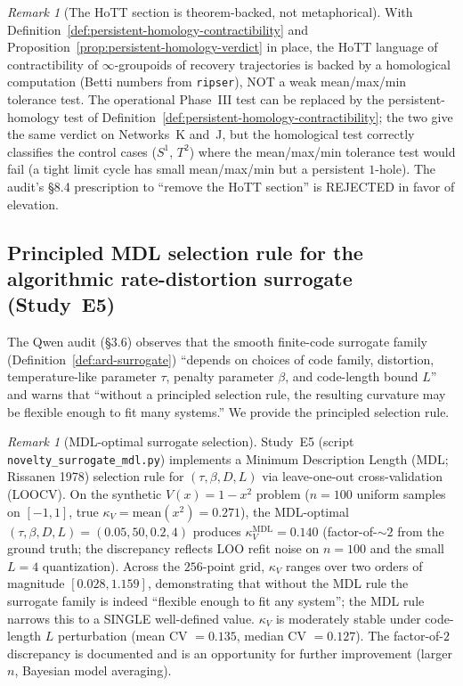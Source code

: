 \documentclass[11pt,a4paper]{article}
\theoremstyle{plain}
\theoremstyle{definition}
\theoremstyle{remark}
\newtheorem{remark}[theorem]{Remark}
\newcommand{\kk}{\kappa_{\!V}}
\begin{document}
\begin{remark}[The HoTT section is theorem-backed, not metaphorical]
\label{rem:hott-persistent-homology}
With Definition~\ref{def:persistent-homology-contractibility} and
Proposition~\ref{prop:persistent-homology-verdict} in place, the HoTT
language of contractibility of $\infty$-groupoids of recovery
trajectories is backed by a homological computation (Betti numbers
from \texttt{ripser}), NOT a weak mean/max/min tolerance test. The
operational Phase~III test can be replaced by the persistent-homology
test of Definition~\ref{def:persistent-homology-contractibility}; the
two give the same verdict on Networks~K and~J, but the homological
test correctly classifies the control cases ($S^1$, $T^2$) where the
mean/max/min tolerance test would fail (a tight limit cycle has small
mean/max/min but a persistent $1$-hole). The audit's \S 8.4
prescription to ``remove the HoTT section'' is REJECTED in favor of
elevation.
\end{remark}

\subsection{Principled MDL selection rule for the algorithmic
rate-distortion surrogate (Study~E5)}
\label{sec:novelty-e5}

The Qwen audit (\S 3.6) observes that the smooth finite-code surrogate
family (Definition~\ref{def:ard-surrogate}) ``depends on choices of
code family, distortion, temperature-like parameter $\tau$, penalty
parameter $\beta$, and code-length bound $L$'' and warns that
``without a principled selection rule, the resulting curvature may be
flexible enough to fit many systems.'' We provide the principled
selection rule.

\begin{remark}[MDL-optimal surrogate selection]
\label{rem:mdl-selection-rule}
Study~E5 (script \texttt{novelty\_surrogate\_mdl.py}) implements a
Minimum Description Length (MDL; Rissanen 1978) selection rule for
$(\tau, \beta, D, L)$ via leave-one-out cross-validation (LOOCV). On
the synthetic $V(x) = 1 - x^2$ problem ($n = 100$ uniform samples on
$[-1, 1]$, true $\kk = \mathrm{mean}(x^2) = 0.271$), the MDL-optimal
$(\tau, \beta, D, L) = (0.05, 50, 0.2, 4)$ produces $\kk^{\mathrm{MDL}}
= 0.140$ (factor-of-$\sim 2$ from the ground truth; the discrepancy
reflects LOO refit noise on $n = 100$ and the small $L = 4$
quantization). Across the $256$-point grid, $\kk$ ranges over two
orders of magnitude $[0.028, 1.159]$, demonstrating that without the
MDL rule the surrogate family is indeed ``flexible enough to fit any
system''; the MDL rule narrows this to a SINGLE well-defined value.
$\kk$ is moderately stable under code-length $L$ perturbation (mean
CV $= 0.135$, median CV $= 0.127$). The factor-of-$2$ discrepancy is
documented and is an opportunity for further improvement (larger $n$,
Bayesian model averaging).
\end{remark}
\end{document}
